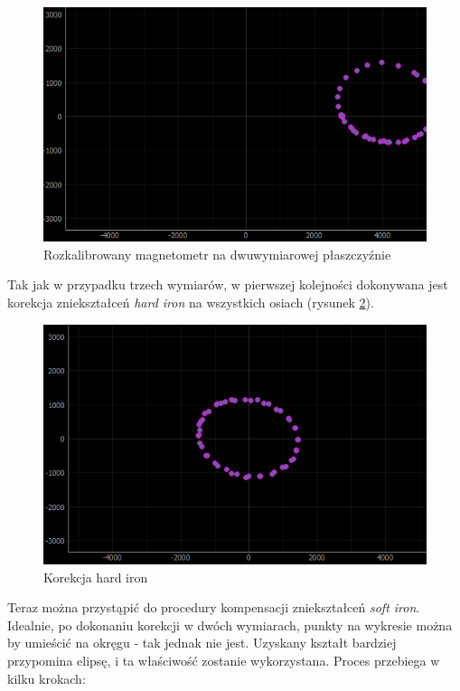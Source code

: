 \begin{figure}[H]
	\centering
		\includegraphics[width=0.8\linewidth]{rys/ScanBot-08-2d-calibration-theta-sigma.PNG}
	\caption{Rozkalibrowany magnetometr na dwuwymiarowej płaszczyźnie}
	\label{fig:2d-mag-no-cal}
\end{figure}

Tak jak w przypadku trzech wymiarów, w pierwszej kolejności dokonywana jest korekcja zniekształceń \emph{hard iron} na wszystkich osiach (rysunek \ref{fig:2d-mag-hard-corr-xy}).

\begin{figure}[H]
	\centering
		\includegraphics[width=0.8\linewidth]{rys/ScanBot-10-2d-calibration-theta-sigma-2-added-hard-offset-reset-data-so-soft-iron-values-are-proper.PNG}
	\caption{Korekcja hard iron}
	\label{fig:2d-mag-hard-corr-xy}
\end{figure}


Teraz można przystąpić do procedury kompensacji zniekształceń \emph{soft iron}. Idealnie, po dokonaniu korekcji w dwóch wymiarach, punkty na wykresie można by umieścić na okręgu - tak jednak nie jest. Uzyskany kształt bardziej przypomina elipsę, i ta właściwość zostanie wykorzystana. Proces przebiega w kilku krokach:

